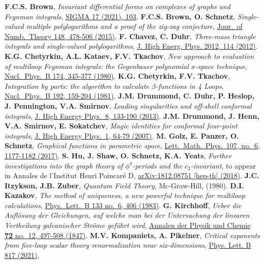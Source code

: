 \documentclass[oneside]{amsart}
\theoremstyle{plain}
\newcommand*{\doilink}[2]{\href{https://doi.org/\detokenize{#2}}{#1}}
\newcommand*{\arxivlink}[2]{\href{https://arxiv.org/abs/\detokenize{#2}}{#1}}
\begin{document}
\begin{thebibliography}{99}
 {\bf F.C.S. Brown}, {\it Invariant differential forms on complexes of graphs and Feynman integrals}, 
\doilink{SIGMA 17 (2021), 103}{10.3842/SIGMA.2021.103}.
 {\bf F.C.S. Brown, O. Schnetz}, {\it Single-valued multiple polylogarithms and a proof of the zig-zag conjecture}, \doilink{Jour.\ of Numb.\ Theory 148, 478-506 (2015)}{10.1016/j.jnt.2014.09.007}.
 {\bf F. Chavez, C. Duhr}, {\it Three-mass triangle integrals and single-valued polylogarithms}, 
\doilink{J. High Energ. Phys. 2012, 114 (2012)}{10.1007/JHEP11(2012)114}.
 {\bf K.G. Chetyrkin, A.L. Kataev, F.V. Tkachov}, {\it New approach to evaluation of multiloop Feynman integrals: the Gegenbauer polynomial $x$-space technique}, 
\doilink{Nucl.\ Phys.\ B 174, 345-377 (1980)}{10.1016/0550-3213(80)90289-8}.
 {\bf K.G. Chetyrkin, F.V. Tkachov}, {\it Integration by parts: the algorithm to calculate $\beta$-functions in 4 Loops}, \doilink{Nucl.\ Phys.\ B 192, 159-204 (1981)}{10.1016/0550-3213(81)90199-1}.
 {\bf J.M. Drummond, C. Duhr, P. Heslop, J. Pennington, V.A. Smirnov}, {\it Leading singularities and off-shell conformal integrals}, \doilink{J. High Energy Phys.\ 8, 133-190 (2013)}{10.1007/JHEP08(2013)133}.
 {\bf J.M. Drummond, J. Henn, V.A. Smirnov, E. Sokatchev}, {\it Magic identities for conformal four-point integrals}, \doilink{J. High Energy Phys.\ 1, 64-79 (2007)}{10.1088/1126-6708/2007/01/064}.
 {\bf M. Golz, E. Panzer, O. Schnetz}, {\it Graphical functions in parametric space}, \doilink{Lett.\ Math.\ Phys.\ 107, no.\ 6, 1177-1182 (2017)}{10.1007/s11005-016-0935-6}.
 {\bf S. Hu, J. Shaw, O. Schnetz, K.A. Yeats}, {\it Further investigations into the graph theory of $\phi^4$-periods and the $c_2$-invariant}, to appear in
Annales de l’Institut Henri Poincar\'e D, \arxivlink{arXiv:1812.08751 [hep-th] (2018)}{1812.08751}.
 {\bf J.C. Itzykson, J.B. Zuber}, {\it Quantum Field Theory}, Mc-Graw-Hill, (1980).
 {\bf D.I. Kazakov}, {\it The method of uniqueness, a new powerful technique for multiloop calculations}, \doilink{Phys.\ Lett.\ B 133 no.\ 6, 406 (1983)}{10.1016/0370-2693(83)90816-X}.
 {\bf G. Kirchhoff}, {\it Ueber die Aufl\"osung der Gleichungen, auf welche man bei der Untersuchung der linearen Vertheilung galvanischer Str\"ome gef\"uhrt wird},
\doilink{Annalen der Physik und Chemie {\bf 72} no.\ 12, 497-508 (1847)}{10.1002/andp.18471481202}.
 {\bf M.V. Kompaniets, A. Pikelner}, {\it Critical exponents from five-loop scalar theory renormalization near six-dimensions}, \doilink{Phys. Lett. B 817 (2021)}{10.1016/j.physletb.2021.136331}.

\end{thebibliography}
\end{document}
